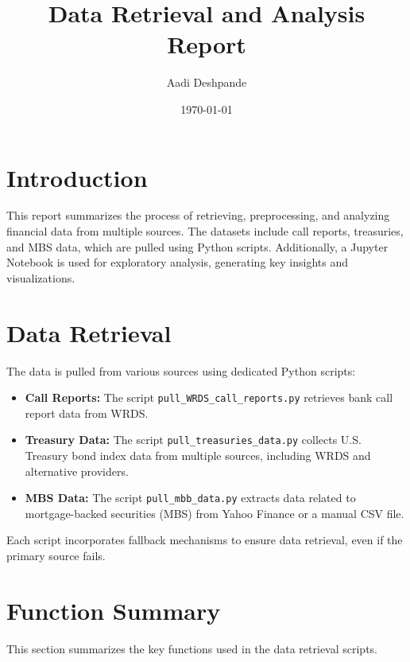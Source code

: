 \documentclass{article}
\title{Data Retrieval and Analysis Report}
\author{Aadi Deshpande}
\date{\today}
\begin{document}
\maketitle

\section{Introduction}
This report summarizes the process of retrieving, preprocessing, and analyzing financial data from multiple sources. The datasets include call reports, treasuries, and MBS data, which are pulled using Python scripts. Additionally, a Jupyter Notebook is used for exploratory analysis, generating key insights and visualizations.

\section{Data Retrieval}
The data is pulled from various sources using dedicated Python scripts:

\begin{itemize}
    \item \textbf{Call Reports:} The script \texttt{pull\_WRDS\_call\_reports.py} retrieves bank call report data from WRDS.
    \item \textbf{Treasury Data:} The script \texttt{pull\_treasuries\_data.py} collects U.S. Treasury bond index data from multiple sources, including WRDS and alternative providers.
    \item \textbf{MBS Data:} The script \texttt{pull\_mbb\_data.py} extracts data related to mortgage-backed securities (MBS) from Yahoo Finance or a manual CSV file.
\end{itemize}

Each script incorporates fallback mechanisms to ensure data retrieval, even if the primary source fails.

\section{Function Summary}

This section summarizes the key functions used in the data retrieval scripts.
\end{document}
